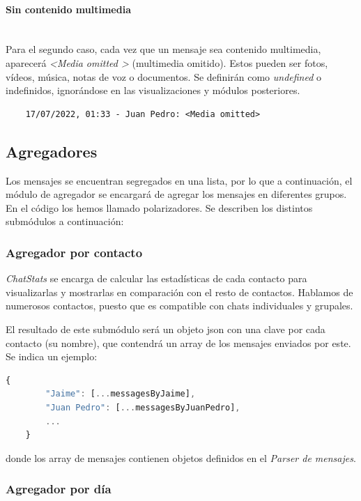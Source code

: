 \paragraph{Sin contenido multimedia}\mbox{}\\

Para el segundo caso, cada vez que un mensaje sea contenido multimedia, aparecerá \textit{\textless Media omitted \textgreater} (multimedia omitido). Estos pueden ser fotos, vídeos, música, notas de voz o documentos. Se definirán como \textit{undefined} o indefinidos, ignorándose en las visualizaciones y módulos posteriores.

\begin{lstlisting}
	17/07/2022, 01:33 - Juan Pedro: <Media omitted>
\end{lstlisting}

\subsection{Agregadores}

Los mensajes se encuentran segregados en una lista, por lo que a continuación, el módulo de agregador se encargará de agregar los mensajes en diferentes grupos. En el código los hemos llamado polarizadores. Se describen los distintos submódulos a continuación:

\subsubsection{Agregador por contacto}

\textit{ChatStats} se encarga de calcular las estadísticas de cada contacto para visualizarlas y mostrarlas en comparación con el resto de contactos. Hablamos de numerosos contactos, puesto que es compatible con chats individuales y grupales.

El resultado de este submódulo será un objeto \acrshort{json} con una clave por cada contacto (su nombre), que contendrá un array de los mensajes enviados por este. Se indica un ejemplo:

\begin{lstlisting}[language=JavaScript]
	{
		"Jaime": [...messagesByJaime],
		"Juan Pedro": [...messagesByJuanPedro],
		...
	}
\end{lstlisting}

donde los array de mensajes contienen objetos definidos en el \textit{Parser de mensajes}.

\subsubsection{Agregador por día}

